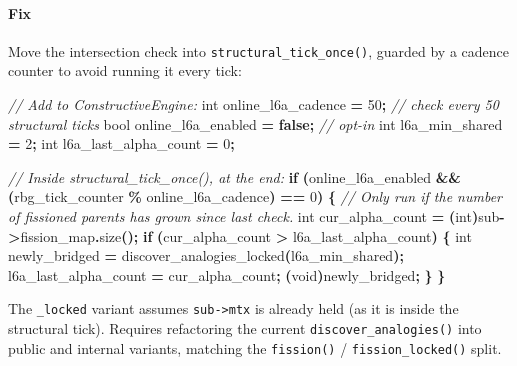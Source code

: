 \documentclass[
  11pt,
  a4paper,
]{article}
\newenvironment{Shaded}{\begin{snugshade}}{\end{snugshade}}
\newcommand{\CommentTok}[1]{\textcolor[rgb]{0.56,0.35,0.01}{\textit{#1}}}
\newcommand{\ControlFlowTok}[1]{\textcolor[rgb]{0.13,0.29,0.53}{\textbf{#1}}}
\newcommand{\DataTypeTok}[1]{\textcolor[rgb]{0.13,0.29,0.53}{#1}}
\newcommand{\DecValTok}[1]{\textcolor[rgb]{0.00,0.00,0.81}{#1}}
\newcommand{\KeywordTok}[1]{\textcolor[rgb]{0.13,0.29,0.53}{\textbf{#1}}}
\newcommand{\NormalTok}[1]{#1}
\newcommand{\OperatorTok}[1]{\textcolor[rgb]{0.81,0.36,0.00}{\textbf{#1}}}
\begin{document}
\paragraph{Fix}\label{fix-1}

Move the intersection check into \texttt{structural\_tick\_once()},
guarded by a cadence counter to avoid running it every tick:

\begin{Shaded}
\begin{Highlighting}[]
\CommentTok{// Add to ConstructiveEngine:}
\DataTypeTok{int}\NormalTok{   online\_l6a\_cadence     }\OperatorTok{=} \DecValTok{50}\OperatorTok{;}    \CommentTok{// check every 50 structural ticks}
\DataTypeTok{bool}\NormalTok{  online\_l6a\_enabled     }\OperatorTok{=} \KeywordTok{false}\OperatorTok{;} \CommentTok{// opt{-}in}
\DataTypeTok{int}\NormalTok{   l6a\_min\_shared         }\OperatorTok{=} \DecValTok{2}\OperatorTok{;}
\DataTypeTok{int}\NormalTok{   l6a\_last\_alpha\_count   }\OperatorTok{=} \DecValTok{0}\OperatorTok{;}

\CommentTok{// Inside structural\_tick\_once(), at the end:}
\ControlFlowTok{if} \OperatorTok{(}\NormalTok{online\_l6a\_enabled}
    \OperatorTok{\&\&} \OperatorTok{(}\NormalTok{rbg\_tick\_counter }\OperatorTok{\%}\NormalTok{ online\_l6a\_cadence}\OperatorTok{)} \OperatorTok{==} \DecValTok{0}\OperatorTok{)}
\OperatorTok{\{}
    \CommentTok{// Only run if the number of fissioned parents has grown since last check.}
    \DataTypeTok{int}\NormalTok{ cur\_alpha\_count }\OperatorTok{=} \OperatorTok{(}\DataTypeTok{int}\OperatorTok{)}\NormalTok{sub}\OperatorTok{{-}\textgreater{}}\NormalTok{fission\_map}\OperatorTok{.}\NormalTok{size}\OperatorTok{();}
    \ControlFlowTok{if} \OperatorTok{(}\NormalTok{cur\_alpha\_count }\OperatorTok{\textgreater{}}\NormalTok{ l6a\_last\_alpha\_count}\OperatorTok{)} \OperatorTok{\{}
        \DataTypeTok{int}\NormalTok{ newly\_bridged }\OperatorTok{=}\NormalTok{ discover\_analogies\_locked}\OperatorTok{(}\NormalTok{l6a\_min\_shared}\OperatorTok{);}
\NormalTok{        l6a\_last\_alpha\_count }\OperatorTok{=}\NormalTok{ cur\_alpha\_count}\OperatorTok{;}
        \OperatorTok{(}\DataTypeTok{void}\OperatorTok{)}\NormalTok{newly\_bridged}\OperatorTok{;}
    \OperatorTok{\}}
\OperatorTok{\}}
\end{Highlighting}
\end{Shaded}

The \texttt{\_locked} variant assumes \texttt{sub-\textgreater{}mtx} is
already held (as it is inside the structural tick). Requires refactoring
the current \texttt{discover\_analogies()} into public and internal
variants, matching the \texttt{fission()} / \texttt{fission\_locked()}
split.
\end{document}
